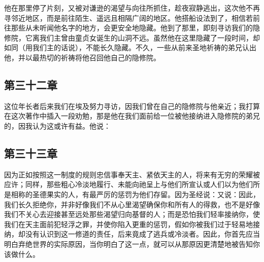他在那里停了片刻，又被对谦逊的渴望与向往所抓住，趁夜寂静逃出，这次他不再寻邻近地区，而是前往陌生、遥远且相隔广阔的地区。他搭船设法到了，相信若前往那些从未听闻他名字的地方，会更安全地隐藏。他到了那里，即刻寻访我们的隐修院，它离我们主曾由童贞女诞生的山洞不远。虽然他在这里隐藏了一段时间，却如同（用我们主的话说），不能长久隐藏。不久，一些从前来圣地祈祷的弟兄认出他，并以最热切的祈祷将他召回他自己的隐修院。\par


\subsection{第三十二章}

\par

这位年长者后来我们在埃及努力寻访，因我们曾在自己的隐修院与他亲近；我打算在这次著作中插入一段劝勉，那是他在我们面前给一位被他接纳进入隐修院的弟兄的，因我认为这或许有益。他说：\par


\subsection{第三十三章}

\par

因为正如按照这一制度的规则忠信事奉天主、紧依天主的人，将来有无穷的荣耀被应许；同样，那些粗心冷淡地履行、未能向祂呈上与他们所宣认或人们以为他们所是相称的圣德果实的人，有最严厉的惩罚为他们存留。因为圣经说：又说：因此，我们长久拒绝你，并非好像我们不从心里渴望确保你和所有人的得救，也不是好像我们不关心去迎接甚至远处那些渴望归向基督的人；而是恐怕我们轻率接纳你，使我们在天主面前犯轻浮之罪，并使你陷入更重的惩罚，假如你被我们过于轻易地接纳，却没有认识到这一修道的责任，后来竟成了逃兵或冷淡者。因此，你首先应当明白弃绝世界的实际原因，当你明白了这一点，就可以从那原因更清楚地被告知你该做什么。\par


